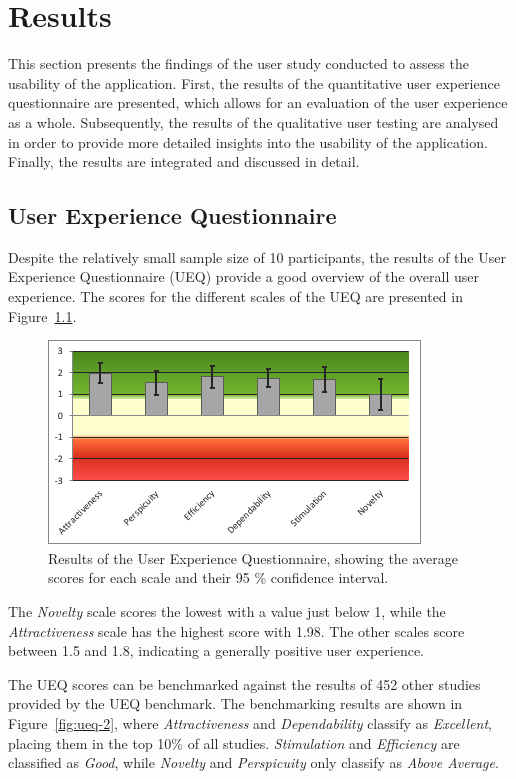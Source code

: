 %
\chapter{Results}
\label{sec:result}

This section presents the findings of the user study conducted to assess the usability of the application.
First, the results of the quantitative user experience questionnaire are presented, which allows for an evaluation of the user experience as a whole.
Subsequently, the results of the qualitative user testing are analysed in order to provide more detailed insights into the usability of the application.
Finally, the results are integrated and discussed in detail.

\section{User Experience Questionnaire}
\label{sec:result:ux}

Despite the relatively small sample size of 10 participants, the results of the User Experience Questionnaire (UEQ) provide a good overview of the overall user experience.
The scores for the different scales of the UEQ are presented in Figure~\ref{fig:ueq-1}. 

\begin{figure}[htb]
  \centering
	\includegraphics[width=.7\textwidth]{figures/ueq-1.png}
	\caption{Results of the User Experience Questionnaire, showing the average scores for each scale and their 95 \% confidence interval.}
  \label{fig:ueq-1}
\end{figure}

The \emph{Novelty} scale scores the lowest with a value just below 1, while the \emph{Attractiveness} scale has the highest score with 1.98.
The other scales score between 1.5 and 1.8, indicating a generally positive user experience.

The UEQ scores can be benchmarked against the results of 452 other studies provided by the UEQ benchmark.
The benchmarking results are shown in Figure~\ref{fig:ueq-2}, where \emph{Attractiveness} and \emph{Dependability} classify as \emph{Excellent}, placing them in the top 10\% of all studies.
\emph{Stimulation} and \emph{Efficiency} are classified as \emph{Good}, while \emph{Novelty} and \emph{Perspicuity} only classify as \emph{Above Average}.

